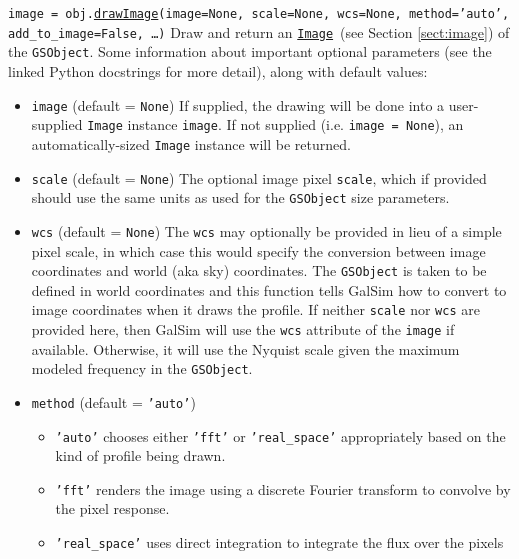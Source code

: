 \documentclass[preprint,10pt]{../../devel/modules/aastex}
\newcommand\drawImage{\href{http://galsim-developers.github.io/GalSim/classgalsim_1_1base_1_1_g_s_object.html\#aafe6ca9d84fe81543fbc105b897273db}{\texttt{drawImage}}}
\newcommand\Image{\href{http://galsim-developers.github.io/GalSim/classgalsim_1_1image_1_1_image.html}{\texttt{Image}}}
\begin{document}
\begin{itemize}
  \texttt{image = obj.}\drawImage\texttt{(image=None, scale=None, wcs=None, method='auto', \\
  \phantom{image = obj.drawImage(}add\_to\_image=False, \dots)}
    \newline
    Draw and return an \Image\ (see Section \ref{sect:image}) of the \texttt{GSObject}.
    Some information about important optional parameters (see the
    linked Python docstrings for more detail), along with default values:
    \begin{itemize}
    \item \texttt{image} (default = \texttt{None}) \newline
      If supplied, the drawing will be done into a user-supplied
      \texttt{Image} instance \texttt{image}.  If not supplied
      (i.e. \texttt{image = None}), an
      automatically-sized \texttt{Image} instance will be returned.
    \item \texttt{scale} (default = \texttt{None}) \newline
      The optional image pixel \texttt{scale}, which if provided
      should use the same units as used for the \texttt{GSObject} size
      parameters.
    \item \texttt{wcs} (default = \texttt{None}) \newline
      The \texttt{wcs} may optionally be provided in lieu of a simple pixel scale,
      in which case this would specify the conversion between image
      coordinates and world (aka sky) coordinates.  The \texttt{GSObject}
      is taken to be defined in world coordinates and this function tells
      GalSim how to convert to image coordinates when it draws the profile.
      If neither \texttt{scale} nor \texttt{wcs} are provided here, then GalSim will
      use the \texttt{wcs} attribute of the \texttt{image} if available.
      Otherwise, it will use the Nyquist scale given the
      maximum modeled frequency in the \texttt{GSObject}.
    \item \texttt{method} (default = \texttt{'auto'})
      \begin{itemize}
        \item \texttt{'auto'} chooses either \texttt{'fft'} or \texttt{'real\_space'}
          appropriately based on the kind of profile being drawn.
        \item \texttt{'fft'} renders the image using a discrete Fourier transform to convolve by the
          pixel response.
        \item \texttt{'real\_space'} uses direct integration to integrate the flux over the pixels

\end{itemize}
\end{itemize}
\end{itemize}
\end{document}
